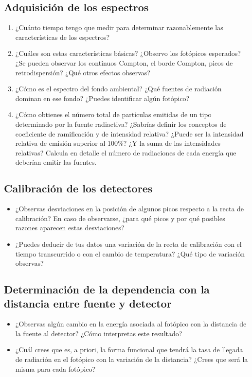 \documentclass[11pt]{article}
\begin{document}
\subsection{Adquisición de los espectros}
\begin{enumerate}[label=\alph*)]
    \item ¿Cuánto tiempo tengo que medir para determinar razonablemente las características de los espectros?
    \item ¿Cuáles son estas características básicas? ¿Observo los fotópicos esperados? ¿Se pueden observar los continuos Compton, el borde Compton, picos de retrodispersión? ¿Qué otros efectos observas?
    \item ¿Cómo es el espectro del fondo ambiental? ¿Qué fuentes de radiación dominan en ese fondo? ¿Puedes identificar algún fotópico?
    \item ¿Cómo obtienes el número total de partículas emitidas de un tipo determinado por la fuente radiactiva? ¿Sabrías definir los conceptos de coeficiente de ramificación y de intensidad relativa? ¿Puede ser la intensidad relativa de emisión superior al 100\%? ¿Y la suma de las intensidades relativas? Calcula en detalle el número de radiaciones de cada energía que deberían emitir las fuentes.
\end{enumerate}

\subsection{Calibración de los detectores}
\begin{itemize}
    \item ¿Observas desviaciones en la posición de algunos picos respecto a la recta de calibración? En caso de observarse, ¿para qué picos y por qué posibles razones aparecen estas desviaciones?
    \item ¿Puedes deducir de tus datos una variación de la recta de calibración con el tiempo transcurrido o con el cambio de temperatura? ¿Qué tipo de variación observas?
\end{itemize}

\subsection{Determinación de la dependencia con la distancia entre fuente y detector}
\begin{itemize}
    \item ¿Observas algún cambio en la energía asociada al fotópico con la distancia de la fuente al detector? ¿Cómo interpretas este resultado?
    \item ¿Cuál crees que es, a priori, la forma funcional que tendrá la tasa de llegada de radiación en el fotópico con la variación de la distancia? ¿Crees que será la misma para cada fotópico?
\end{itemize}
\end{document}
